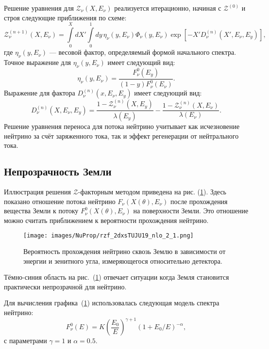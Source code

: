 Решение уравнения для $\mathcal{Z}_{\nu}(X,E_\nu)$ реализуется итерационно, начиная с $\mathcal{Z}^{(0)}$ и строя следующие приближения по схеме:
\begin{equation}
\mathcal{Z}^{(n+1)}_{\nu}(X,E_\nu) = \int\limits_0^X dX' \int\limits_0^1 dy\,\eta_{\nu}(y,E_\nu)\Phi_{\nu}(y,E_\nu)\exp\left[ -X'D^{(n)}_{\nu}(X',E_\nu,E_y) \right],
\end{equation}
где $\eta_{\nu}(y,E_\nu)$ — весовой фактор, определяемый формой начального спектра. Точное выражение для $\eta_{\nu}(y,E_\nu)$ имеет следующий вид: 
\begin{equation}
    \eta_{\nu}(y,E_\nu) = \frac{F^0_{\nu}(E_y)}{(1-y)F^0_{\nu}(E_\nu)}.
\end{equation}
Выражение для фактора $D^{(n)}_{\nu}(x, E_\nu, E_y)$ имеет следующий вид:
\begin{equation}
    D^{(n)}_{\nu}(X, E_\nu, E_y) = \frac{1-\mathcal{Z}_{\nu}^{(n)}(X, E_y)}{\lambda(E_y)} - \frac{1-\mathcal{Z}_{\nu}^{(n)}(X, E_\nu)}{\lambda(E_\nu)}.
\end{equation}
Решение уравнения переноса для потока нейтрино учитывает как исчезновение нейтрино за счёт заряженного тока, так и эффект регенерации от нейтрального тока. 

\subsection{Непрозрачность Земли}
Иллюстрация решения $\mathcal{Z}$-факторным методом приведена на  рис. (\ref{EF2}). Здесь показано отношение потока нейтрино $F_\nu(X(\theta),E_\nu)$  после прохождения вещества Земли к потоку $F_\nu^0(X(\theta),E_\nu)$ на поверхности Земли. Это  отношение можно считать приближением к вероятности прохождения нейтрино.
\begin{figure}[!h]
\centering
\texttt{[image: images/NuProp/rzf\_2dxsTUJU19\_nlo\_2\_1.png]}
\caption{Вероятность прохождения нейтрино сквозь Землю в зависимости от энергии и зенитного угла, измеряющегося относительно детектора.}
\label{EF2}
\end{figure}
Тёмно-синия область на рис.~(\ref{EF2}) отвечает ситуации когда Земля становится практически непрозрачной для нейтрино.

Для вычисления графика~(\ref{EF2}) использовалась следующая модель спектра нейтрино:
\begin{equation}
    F_{\nu}^{0}(E) = K\left(\frac{E_0}{E}\right)^{\gamma+1} (1+E_0/E)^{-\alpha},%
\end{equation}
с параметрами $\gamma = 1$ и $\alpha = 0.5$. 
